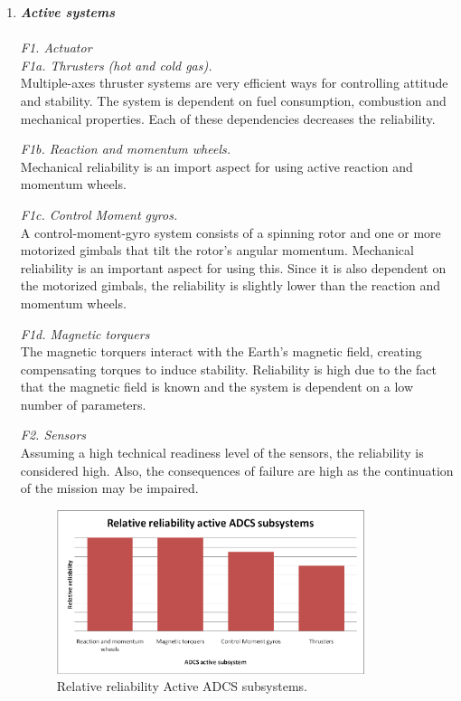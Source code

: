\begin{enumerate}[A]
	\item  \textbf{\textit{Active systems}} \\\\
\textit{F1. Actuator}\\

\textit{F1a. Thrusters (hot and cold gas).}\\ 
Multiple-axes thruster systems are very efficient ways for controlling attitude and stability. The system is dependent on fuel consumption, combustion and mechanical properties. Each of these dependencies decreases the reliability. 

\textit{F1b. Reaction and momentum wheels.}\\ 
Mechanical reliability is an import aspect for using active reaction and momentum wheels. 

\textit{F1c. Control Moment gyros.}\\ 
A control-moment-gyro system consists of a spinning rotor and one or more motorized gimbals that tilt the rotor's angular momentum. Mechanical reliability is an important aspect for using this. Since it is also dependent on the motorized gimbals, the reliability is slightly lower than the reaction and momentum wheels.

\textit{F1d. Magnetic torquers}\\ 
The magnetic torquers interact with the Earth's magnetic field, creating compensating torques to induce stability. Reliability is high due to the fact that the magnetic field is known and the system is dependent on a low number of parameters.

\textit{F2. Sensors}\\ 
Assuming a high technical readiness level of the sensors, the reliability is considered high. Also, the consequences of failure are high as the continuation of the mission may be impaired.

\begin{figure} [h]
	\begin{center}
 \includegraphics[width=0.85\textwidth,angle=0]{chapters/img/TRA_ADCS_A.png}	
	\caption{Relative reliability Active ADCS subsystems.}
	\label{TRA_ADCS_A}
	\end{center}
\end{figure}


\end{enumerate}
